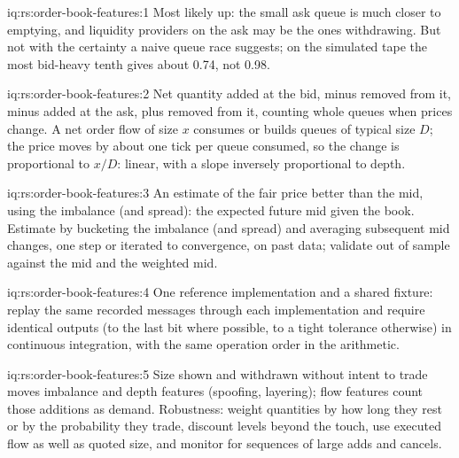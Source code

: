 \begin{solution}{iq:rs:order-book-features:1}
Most likely up: the small ask queue is much closer to emptying, and liquidity providers on the ask may be the ones withdrawing. But not with
the certainty a naive queue race suggests; on the simulated tape the most bid-heavy tenth gives about 0.74, not 0.98.
\end{solution}

\begin{solution}{iq:rs:order-book-features:2}
Net quantity added at the bid, minus removed from it, minus added at the ask, plus removed from it, counting whole queues when prices change.
A net order flow of size $x$ consumes or builds queues of typical size $D$; the price moves by about one tick per queue consumed, so the
change is proportional to $x/D$: linear, with a slope inversely proportional to depth.
\end{solution}

\begin{solution}{iq:rs:order-book-features:3}
An estimate of the fair price better than the mid, using the imbalance (and spread): the expected future mid given the book. Estimate by
bucketing the imbalance (and spread) and averaging subsequent mid changes, one step or iterated to convergence, on past data; validate out of
sample against the mid and the weighted mid.
\end{solution}

\begin{solution}{iq:rs:order-book-features:4}
One reference implementation and a shared fixture: replay the same recorded messages through each implementation and require identical
outputs (to the last bit where possible, to a tight tolerance otherwise) in continuous integration, with the same operation order in the
arithmetic.
\end{solution}

\begin{solution}{iq:rs:order-book-features:5}
Size shown and withdrawn without intent to trade moves imbalance and depth features (spoofing, layering); flow features count those additions
as demand. Robustness: weight quantities by how long they rest or by the probability they trade, discount levels beyond the touch, use
executed flow as well as quoted size, and monitor for sequences of large adds and cancels.
\end{solution}

